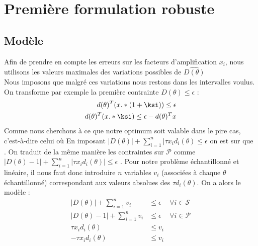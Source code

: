 \section{Première formulation robuste}
\subsection{Modèle}

Afin de prendre en compte les erreurs sur les facteurs d'amplification $x_i$, nous utilisons les valeurs maximales des variations possibles de $\hat{D(\theta)}$\\
Nous imposons que malgré ces variations nous restons dans les intervalles voulus. On transforme par exemple la première contrainte $D(\theta)\leq \epsilon$ :
\begin{eqnarray*}
d(\theta)^T (x.*(1+\ksi)) \leq \epsilon \\ 
d(\theta)^T (x.*\ksi) \leq \epsilon- d(\theta)^T x \\
\end{eqnarray*}
Comme nous cherchons à ce que notre optimum soit valable dans le pire cas, c'est-à-dire celui où
En imposant $|D(\theta)| + \sum_{i=1}^{n} | \tau x_i d_i(\theta)\leq \epsilon $ on est sur que . On traduit de la même manière les contraintes sur $\mathcal{P}$ comme $|D(\theta)-1| + \sum_{i=1}^{n} |\tau x_i d_i(\theta)|\leq \epsilon $ . 
Pour notre problème échantillonné et linéaire, il nous faut donc introduire $n$ variables $v_i$ (associées à chaque $\theta$ échantillonné) correspondant aux valeurs absolues des $\tau d_i(\theta)$. On a alors le modèle : 
\begin{align}
|D(\theta)| + \sum_{i=1}^{n} v_i & \leq  \epsilon & \forall i \in \mathcal{S} \\
|D(\theta)-1| + \sum_{i=1}^{n}v_i & \leq  \epsilon & \forall i \in \mathcal{P} \\
\tau x_i d_i(\theta) & \leq  v_i \\
-\tau x_i d_i(\theta) & \leq  v_i 
\end{align}

